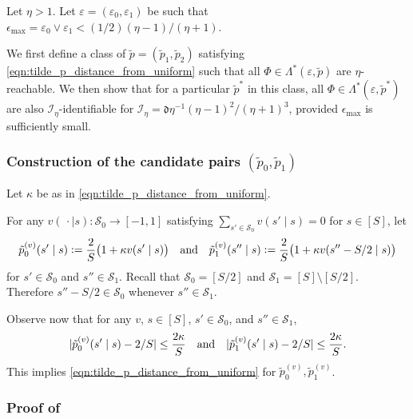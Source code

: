 \documentclass[11pt]{article}
\newcommand{\eqdef}{\vcentcolon=}
\newcommand{\mf}[1]{\mathfrak{#1}}
\newcommand{\mcI}{\mathcal{I}}
\newcommand{\mcS}{\mathcal{S}}
\theoremstyle{definition}
\theoremstyle{definition}
\begin{document}
Let $\eta>1$.
Let
$
	\varepsilon = (\varepsilon_0, \varepsilon_1)
$
be such that
$
	\epsilon_{\max}
	=
	\varepsilon_0 \vee \varepsilon_1
	<
	(1/2)(\eta-1)/(\eta+1)
$.

We first define a class of $\tilde{p} = ( \tilde{p}_1, \tilde{p}_2 )$ satisfying \eqref{eqn:tilde_p_distance_from_uniform} such that all $\Phi\in \Lambda^*( \varepsilon, \tilde{p} )$ are $\eta$-reachable.
We then show that for a particular $\tilde{p}^*$ in this class, all $\Phi\in \Lambda^*(\varepsilon, \tilde{p}^*)$ are also $\mcI_{\eta}$-identifiable for $\mcI_{\eta} = \mf{d}\eta^{-1}(\eta-1)^2/(\eta+1)^3$, provided $\epsilon_{\max}$ is sufficiently small.

\subsubsection{Construction of the candidate pairs \texorpdfstring{$( \tilde{p}_0, \tilde{p}_1 )$}{(p0, p1)}}

Let $\kappa$ be as in \eqref{eqn:tilde_p_distance_from_uniform}.

For any $v(\,\cdot\mid  s ): \mcS_0\rightarrow [-1,1]$ satisfying $\sum_{s'\in \mcS_0}v(s' \mid s)=0$ for $s\in[S]$, let
\begin{equation}
	\tilde{p}^{(v)}_0(s' \mid s)
	\eqdef
	\frac{2}{S}
	\bigl(
	1
	+
	\kappa v(s' \mid s)
	\bigr)
	\quad
	\mathrm{and}
	\quad
	\tilde{p}^{(v)}_1(s'' \mid s)
	\eqdef
	\frac{2}{S}
	\bigl(
	1
	+
	\kappa v(s''-S/2 \mid s)
	\bigr)
	\label{eqn:p_tilde_choice_with_packing}
\end{equation}
for $s' \in \mcS_0$ and $s''\in\mcS_1$.
Recall that $\mcS_0 = [S/2]$ and $\mcS_1 = [S] \setminus [S/2]$.
Therefore $s'' - S/2 \in \mcS_0$ whenever $s'' \in \mcS_1$.

Observe now that for any $v$, $s\in[S]$, $s'\in\mcS_0$, and $s''\in\mcS_1$,
\begin{equation}
	| \tilde{p}^{(v)}_0(s' \mid s)-2/S |
	\leq
	\frac{2\kappa}{S}
	\quad
	\textnormal{and}
	\quad
	| \tilde{p}^{(v)}_1(s' \mid s)-2/S |
	\leq
	\frac{2\kappa}{S}
	.
\end{equation}
This implies \eqref{eqn:tilde_p_distance_from_uniform} for $\tilde{p}^{(v)}_0,\tilde{p}^{(v)}_1$.

\subsubsection{Proof of \texorpdfstring{}{reachability}}
\end{document}
